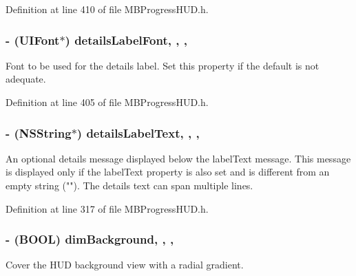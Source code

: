 Definition at line 410 of file M\+B\+Progress\+H\+U\+D.\+h.

\hypertarget{interface_m_b_progress_h_u_d_af070a363d323d8eb0285e38d398b51c2}{
\subsubsection[{details\+Label\+Font}]{\setlength{\rightskip}{0pt plus 5cm}-\/ (U\+I\+Font$\ast$) details\+Label\+Font\hspace{0.3cm}{\ttfamily [read]}, {\ttfamily [write]}, {\ttfamily [atomic]}, {\ttfamily [assign]}}}\label{interface_m_b_progress_h_u_d_af070a363d323d8eb0285e38d398b51c2}
Font to be used for the details label. Set this property if the default is not adequate. 

Definition at line 405 of file M\+B\+Progress\+H\+U\+D.\+h.

\hypertarget{interface_m_b_progress_h_u_d_a8b7cbf551fc551c64159b7a3f648c6ac}{
\subsubsection[{details\+Label\+Text}]{\setlength{\rightskip}{0pt plus 5cm}-\/ (N\+S\+String$\ast$) details\+Label\+Text\hspace{0.3cm}{\ttfamily [read]}, {\ttfamily [write]}, {\ttfamily [atomic]}, {\ttfamily [copy]}}}\label{interface_m_b_progress_h_u_d_a8b7cbf551fc551c64159b7a3f648c6ac}
An optional details message displayed below the label\+Text message. This message is displayed only if the label\+Text property is also set and is different from an empty string (""). The details text can span multiple lines. 

Definition at line 317 of file M\+B\+Progress\+H\+U\+D.\+h.

\hypertarget{interface_m_b_progress_h_u_d_ab781ccd4428c8eff6907d2cdc90fc3ee}{
\subsubsection[{dim\+Background}]{\setlength{\rightskip}{0pt plus 5cm}-\/ (B\+O\+O\+L) dim\+Background\hspace{0.3cm}{\ttfamily [read]}, {\ttfamily [write]}, {\ttfamily [atomic]}, {\ttfamily [assign]}}}\label{interface_m_b_progress_h_u_d_ab781ccd4428c8eff6907d2cdc90fc3ee}
Cover the H\+U\+D background view with a radial gradient. 


